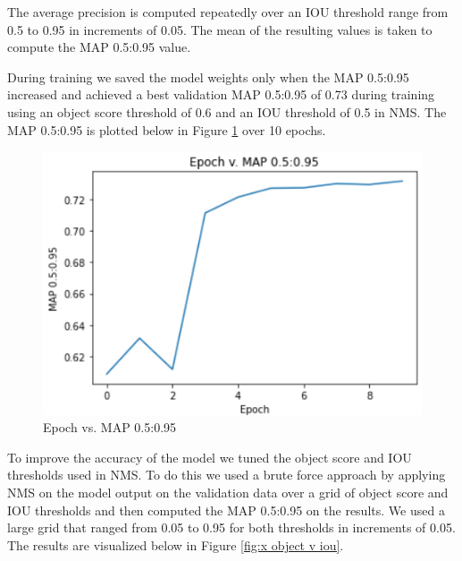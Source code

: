 \documentclass{article}
\begin{document}
\begin{minipage}{1\textwidth}%
The average precision is computed repeatedly over an IOU threshold range from 0.5 to 0.95 in increments of 0.05.  The mean of the resulting values is taken to compute the MAP 0.5:0.95 value. \\
\end{minipage}%

\noindent During training we saved the model weights only when the MAP 0.5:0.95 increased and achieved a best validation MAP 0.5:0.95 of 0.73 during training using an object score threshold of 0.6 and an IOU threshold of 0.5 in NMS.  The MAP 0.5:0.95 is plotted below in Figure \ref{fig:x epoch_v_map} over 10 epochs.   

\newpage

\begin{figure}[h]
\centering
	\includegraphics[scale=0.7]{final-report-images/epoch_v_map.png}
\caption{Epoch vs. MAP 0.5:0.95}
\label{fig:x epoch_v_map}
\end{figure}

To improve the accuracy of the model we tuned the object score and IOU thresholds used in NMS.  To do this we used a brute force approach by applying NMS on the model output on the validation data over a grid of object score and IOU thresholds and then computed the MAP 0.5:0.95 on the results.  We used a large grid that ranged from 0.05 to 0.95 for both thresholds in increments of 0.05.  The results are visualized below in Figure \ref{fig:x object v iou}.  
\end{document}
